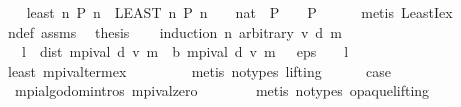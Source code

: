 \begin{isabellebody}
\ \ \isamarkupfalse%
\ least{}{\isacharcolon}{\kern0pt}\ {\isachardoublequoteopen}{\isasymexists}n{\isachardot}{\kern0pt}\ P\ n\ {\isasymLongrightarrow}\ {\isacharparenleft}{\kern0pt}LEAST\ n{\isachardot}{\kern0pt}\ P\ n{\isacharparenright}{\kern0pt}\ {\isacharequal}{\kern0pt}\ {\isacharparenleft}{\kern0pt}{}\ {\isacharcolon}{\kern0pt}{\isacharcolon}{\kern0pt}\ nat{\isacharparenright}{\kern0pt}\ {\isasymLongrightarrow}\ P\ {}{\isachardoublequoteclose}\ \ \ P\isanewline
\ \ \ \ \isamarkupfalse%
\ {\isacharparenleft}{\kern0pt}metis\ LeastI{\isacharunderscore}{\kern0pt}ex{\isacharparenright}{\kern0pt}\isanewline
\ \ \isamarkupfalse%
\ n{\isacharunderscore}{\kern0pt}def\ assms\ \isamarkupfalse%
\ {\isacharquery}{\kern0pt}thesis\isanewline
\ \ \isamarkupfalse%
\ {\isacharparenleft}{\kern0pt}induction\ n\ arbitrary{\isacharcolon}{\kern0pt}\ v\ d\ m{\isacharparenright}{\kern0pt}\isanewline
\ \ \ \ \isamarkupfalse%
\ {}\isanewline
\ \ \ \ \isamarkupfalse%
\ {\isachardoublequoteopen}{}\ {\isacharasterisk}{\kern0pt}\ l\ {\isacharasterisk}{\kern0pt}\ dist\ {\isacharparenleft}{\kern0pt}mpi{\isacharunderscore}{\kern0pt}val\ d\ v\ m\ {}{\isacharparenright}{\kern0pt}\ {\isacharparenleft}{\kern0pt}{\isasymL}\isactrlsub b\ {\isacharparenleft}{\kern0pt}mpi{\isacharunderscore}{\kern0pt}val\ d\ v\ m\ {}{\isacharparenright}{\kern0pt}{\isacharparenright}{\kern0pt}\ {\isacharless}{\kern0pt}\ eps\ {\isacharasterisk}{\kern0pt}\ {\isacharparenleft}{\kern0pt}{}\ {\isacharminus}{\kern0pt}\ l{\isacharparenright}{\kern0pt}{\isachardoublequoteclose}\isanewline
\ \ \ \ \ \ \isamarkupfalse%
\ least{}\ mpi{\isacharunderscore}{\kern0pt}val{\isacharunderscore}{\kern0pt}term{\isacharunderscore}{\kern0pt}ex\ {}\isanewline
\ \ \ \ \ \ \isamarkupfalse%
\ {\isacharparenleft}{\kern0pt}metis\ {\isacharparenleft}{\kern0pt}no{\isacharunderscore}{\kern0pt}types{\isacharcomma}{\kern0pt}\ lifting{\isacharparenright}{\kern0pt}{\isacharparenright}{\kern0pt}\isanewline
\ \ \ \ \isamarkupfalse%
\ {\isacharquery}{\kern0pt}case\isanewline
\ \ \ \ \ \ \isamarkupfalse%
\ {}\ mpi{\isacharunderscore}{\kern0pt}algo{\isachardot}{\kern0pt}domintros\ mpi{\isacharunderscore}{\kern0pt}val{\isacharunderscore}{\kern0pt}zero\isanewline
\ \ \ \ \ \ \isamarkupfalse%
\ {\isacharparenleft}{\kern0pt}metis\ {\isacharparenleft}{\kern0pt}no{\isacharunderscore}{\kern0pt}types{\isacharcomma}{\kern0pt}\ opaque{\isacharunderscore}{\kern0pt}lifting{\isacharparenright}{\kern0pt}{\isacharparenright}{\kern0pt}\isanewline

\end{isabellebody}
